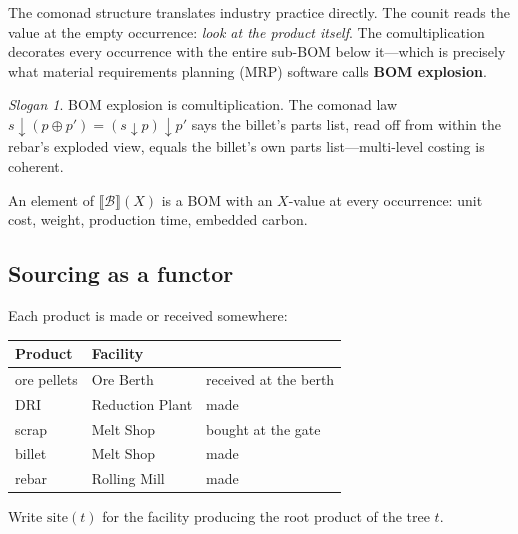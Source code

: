 \documentclass[11pt,a4paper]{article}
\newcommand{\Ext}[1]{\llbracket #1 \rrbracket}
\newcommand{\B}{\mathcal{B}}
\newcommand{\dc}{\mathbin{\downarrow}}
\newcommand{\site}{\mathrm{site}}
\theoremstyle{plain}
\theoremstyle{definition}
\theoremstyle{remark}
\newtheorem{slogan}[theorem]{Slogan}
\begin{document}
The comonad structure translates industry practice directly. The
counit reads the value at the empty occurrence: \emph{look at the
product itself}. The comultiplication decorates every occurrence
with the entire sub-BOM below it---which is precisely what
material requirements planning (MRP) software calls \textbf{BOM
explosion}.

\begin{slogan}
BOM explosion is comultiplication. The comonad law
$s \dc (p \oplus p') = (s \dc p) \dc p'$ says the billet's parts
list, read off from within the rebar's exploded view, equals the
billet's own parts list---multi-level costing is coherent.
\end{slogan}

An element of $\Ext{\B}(X)$ is a BOM with an $X$-value at every
occurrence: unit cost, weight, production time, embedded carbon.

\subsection{Sourcing as a functor}\label{sec:sourcing}

Each product is made or received somewhere:

\begin{center}
\begin{tabular}{lll}
\toprule
Product & Facility & \\
\midrule
ore pellets & Ore Berth & received at the berth \\
DRI & Reduction Plant & made \\
scrap & Melt Shop & bought at the gate \\
billet & Melt Shop & made \\
rebar & Rolling Mill & made \\
\bottomrule
\end{tabular}
\end{center}

Write $\site(t)$ for the facility producing the
root product of the tree $t$.
\end{document}

